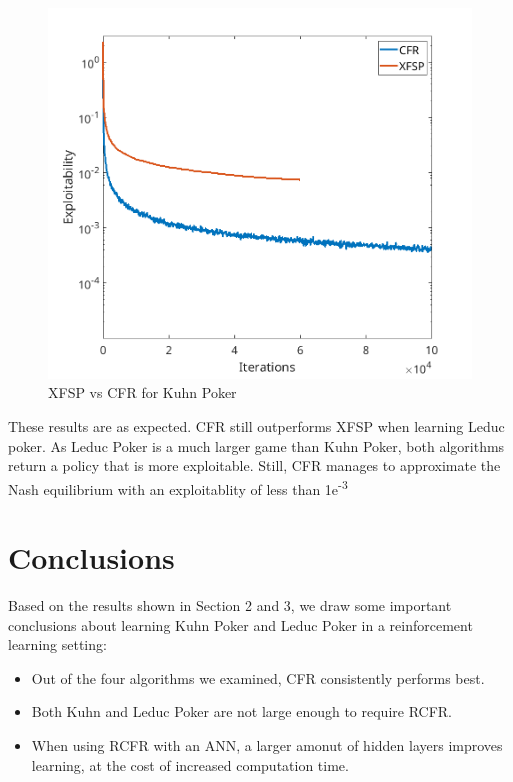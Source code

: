 \documentclass[10pt,a4paper]{article}
\begin{document}
\begin{figure}[h]
\centering
\includegraphics[scale=0.4]{Figures/cfr_vs_xfsp_leduc.png}
\caption{XFSP vs CFR for Kuhn Poker}
\label{fig:xfsp_vs_cfr_leduc}
\end{figure}

These results are as expected. CFR still outperforms XFSP when learning Leduc poker. As Leduc Poker is a much larger game than Kuhn Poker, both algorithms return a policy that is more exploitable. Still, CFR manages to approximate the Nash equilibrium with an exploitablity of less than 1e\textsuperscript{-3}

\section{Conclusions}

Based on the results shown in Section 2 and 3, we draw some important conclusions about learning Kuhn Poker and Leduc Poker in a reinforcement learning setting:

\begin{itemize}
\item{Out of the four algorithms we examined, CFR consistently performs best. }
\item{Both Kuhn and Leduc Poker are not large enough to require RCFR.}
\item{When using RCFR with an ANN, a larger amonut of hidden layers improves learning, at the cost of increased computation time.}
\end{itemize}
\end{document}
